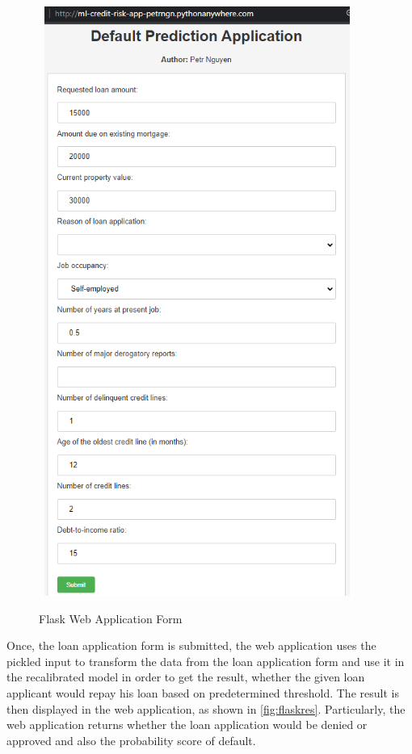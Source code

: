 \begin{figure}[H]
    \centering
    \caption{Flask Web Application Form}\vspace{0.5em}
    \label{fig:flaskform}\
    \includegraphics[width=100mm]{Figures/flask_app_form.jpg}

    \vspace{-1em}
\end{figure}
\clearpage

Once, the loan application form is submitted, the web application uses the pickled input to transform the data from the loan application form and use it in the recalibrated model in order to get the result, whether the given loan applicant would repay his loan based on predetermined threshold. The result is then displayed in the web application, as shown in \autoref{fig:flaskres}.
Particularly, the web application returns whether the loan application would be denied or approved and also the probability score of default.

